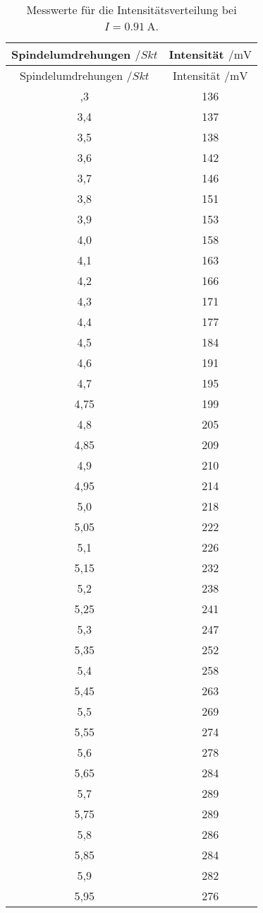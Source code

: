 \begin{longtable}{cc}
  \caption{Messwerte für die Intensitätsverteilung bei $I=\SI{0.91}{\ampere}$.}\\
  \hline
  \toprule
  Spindelumdrehungen $/Skt$ & Intensität $/\si{\milli\volt}$ \\
  \midrule
\endfirsthead
\toprule
Spindelumdrehungen $/Skt$ & Intensität $/\si{\milli\volt}$ \\
\midrule
\endhead
\bottomrule
\endfoot
\bottomrule
\bottomrule
\endlastfoot
3,3 & 136\\
3,4 & 137\\
3,5 & 138\\
3,6 & 142\\
3,7 & 146\\
3,8 & 151\\
3,9 & 153\\
4,0  & 158\\
4,1  & 163\\
4,2  & 166\\
4,3  & 171\\
4,4  & 177\\
4,5  & 184\\
4,6  & 191\\
4,7  & 195\\
4,75 & 199\\
4,8  & 205\\
4,85 & 209\\
4,9  & 210\\
4,95 & 214\\
5,0  & 218\\
5,05 & 222\\
5,1  & 226\\
5,15 & 232\\
5,2  & 238\\
5,25 & 241\\
5,3  & 247\\
5,35 & 252\\
5,4  & 258\\
5,45 & 263\\
5,5  & 269\\
5,55 & 274\\
5,6  & 278\\
5,65 & 284\\
5,7  & 289\\
5,75 & 289\\
5,8  & 286\\
5,85 & 284\\
5,9  & 282\\
5,95 & 276\\

\end{longtable}
